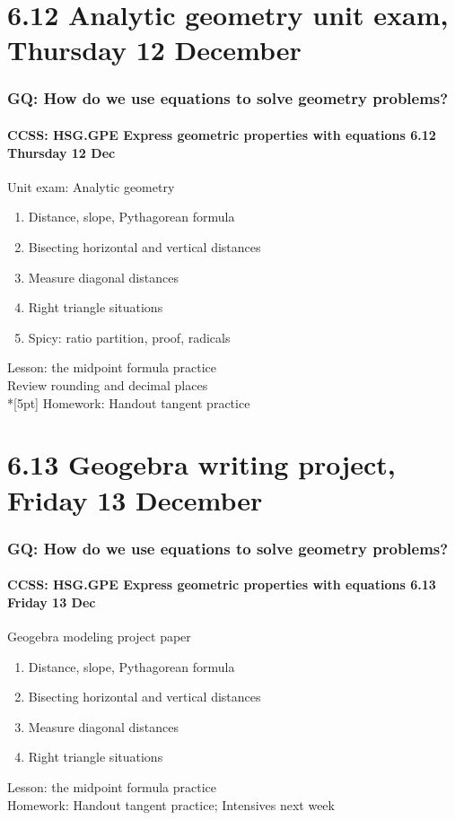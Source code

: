 \documentclass{beamer}
\begin{document}
\section{6.12 Analytic geometry unit exam, Thursday 12 December}
\frame
{
  \frametitle{GQ: How do we use equations to solve geometry problems?}
  \framesubtitle{CCSS: HSG.GPE Express geometric properties with equations \hfill \alert{6.12 Thursday 12 Dec}}

  \begin{block}{Unit exam: Analytic geometry}
  \begin{enumerate}
    \item Distance, slope, Pythagorean formula
    \item Bisecting horizontal and vertical distances
    \item Measure diagonal distances
    \item Right triangle situations
    \item Spicy: ratio partition, proof, radicals
  \end{enumerate}
  \end{block}
  Lesson: the midpoint formula practice\\
  Review rounding and decimal places \\*[5pt]
  Homework: Handout tangent practice
}

\section{6.13 Geogebra writing project, Friday 13 December}
\frame
{
  \frametitle{GQ: How do we use equations to solve geometry problems?}
  \framesubtitle{CCSS: HSG.GPE Express geometric properties with equations \hfill \alert{6.13 Friday 13 Dec}}

  \begin{block}{Geogebra modeling project paper}
  \begin{enumerate}
    \item Distance, slope, Pythagorean formula
    \item Bisecting horizontal and vertical distances
    \item Measure diagonal distances
    \item Right triangle situations
  \end{enumerate}
  \end{block}
  Lesson: the midpoint formula practice\\
  Homework: Handout tangent practice; Intensives next week
}
\end{document}

